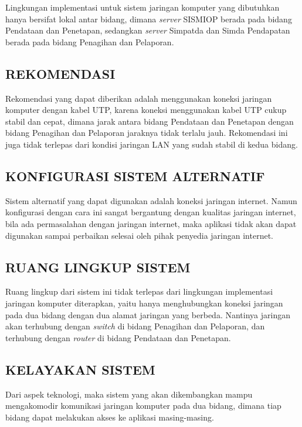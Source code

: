 \documentclass[pdftex,12pt, oneside]{article}
\begin{document}
Lingkungan implementasi untuk sistem jaringan komputer yang dibutuhkan hanya bersifat lokal antar bidang, dimana \textit{server} SISMIOP berada pada bidang Pendataan dan Penetapan, sedangkan \textit{server} Simpatda dan Simda Pendapatan berada pada bidang Penagihan dan Pelaporan.

\subsection{REKOMENDASI}

Rekomendasi yang dapat diberikan adalah menggunakan koneksi jaringan komputer dengan kabel UTP, karena koneksi menggunakan kabel UTP cukup stabil dan cepat, dimana jarak antara bidang Pendataan dan Penetapan dengan bidang Penagihan dan Pelaporan jaraknya tidak terlalu jauh. Rekomendasi ini juga tidak terlepas dari kondisi jaringan LAN yang sudah stabil di kedua bidang.

\subsection{KONFIGURASI SISTEM ALTERNATIF}

Sistem alternatif yang dapat digunakan adalah koneksi jaringan internet. Namun konfigurasi dengan cara ini sangat bergantung dengan kualitas jaringan internet, bila ada permasalahan dengan jaringan internet, maka aplikasi tidak akan dapat digunakan sampai perbaikan selesai oleh pihak penyedia jaringan internet.

\subsection{RUANG LINGKUP SISTEM}

Ruang lingkup dari sistem ini tidak terlepas dari lingkungan implementasi jaringan komputer diterapkan, yaitu hanya menghubungkan koneksi jaringan pada dua bidang dengan dua alamat jaringan yang berbeda. Nantinya jaringan akan terhubung dengan \textit{switch} di bidang Penagihan dan Pelaporan, dan terhubung dengan \textit{router} di bidang Pendataan dan Penetapan.

\subsection{KELAYAKAN SISTEM}

Dari aspek teknologi, maka sistem yang akan dikembangkan mampu mengakomodir komunikasi jaringan komputer pada dua bidang, dimana tiap bidang dapat melakukan akses ke aplikasi masing-masing.
\end{document}
